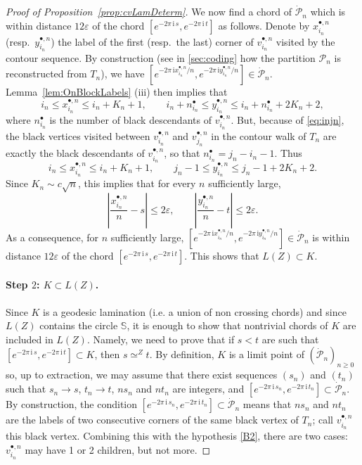 \documentclass[10pt]{amsart}
\theoremstyle{definition}\newtheorem{defi}[theo]{Definition}\newtheorem{rema}[theo]{Remark}\newtheorem{exam}[theo]{Example}\newtheorem{exem}[theo]{Example}\newtheorem{nota}[theo]{Notation}
\def\S{\mathbb{S}}
\def\PPP{\mathcal P}
\def\dPn{\dot{\mathcal{P}}_{n}}
\renewcommand{\epsilon}{\varepsilon}
\begin{document}
\begin{proof}[Proof of Proposition~\ref{prop:cvLamDeterm}]
We now find a chord of $ \dPn $ which is within distance $12\epsilon$ of the chord $[e^{-2\pi\, \textrm{i}\, s}, e^{-2\pi\, \textrm{i}\, t}]$ as follows. Denote by  $x^{\bullet,n}_{i_{n}}$ (resp.~$y ^{\bullet,n}_{i_{n}}$)  the label of the first (resp.~the last) corner of $v^{\bullet,n}_{i_{n}}$ visited by the contour sequence.
By construction (see in \cref{sec:coding} how the partition $\PPP_{n} $ is reconstructed from $T_{n}$),
we have $[e^{-2\pi\, \textrm{i} {x^{\bullet,n}_{i_{n}}}/{n}}, e^{-2\pi\, \textrm{i} {y ^{\bullet,n}_{i_{n}}}/{n}}] \in \dPn$.
Lemma~\ref{lem:OnBlockLabels}  (iii) then implies that
\begin{equation}
  i_{n} \leq x^{\bullet,n}_{i_{n}} \leq i_{n}+ K_{n}+1, \qquad  i_{n}+n^{\bullet}_{i_{n}} \leq y^{\bullet,n}_{i_{n}} \leq   i_{n}+n^{\bullet}_{i_{n}} + 2 K_{n}+2,
  \label{eq:Control_xy}
\end{equation}
where $n^{\bullet}_{i_{n}} $ is the number of black descendants of $v^{\bullet,n}_{i_{n}}$.
But, because of \eqref{eq:injn},  the black vertices visited between $v^{\bullet,n}_{i_{n}}$ and $v^{\bullet,n}_{j_{n}}$
in the contour walk of $T_{n}$ are exactly the black descendants of $v^{\bullet,n}_{i_{n}}$,
so that $n^{\bullet}_{i_{n}}= j_{n}-i_{n}-1$. Thus
\[i_{n} \leq x^{\bullet,n}_{i_{n}} \leq i_{n}+ K_{n}+1, \qquad  j_{n}-1 \leq y^{\bullet,n}_{i_{n}} \leq    j_{n}-1 + 2 K_{n}+2.\]
Since $K_{n} \sim c \sqrt{n}$, this implies that for every $n$ sufficiently large,
\[\left| \frac{x^{\bullet,n}_{i_{n}}}{n}-s \right| \leq 2 \epsilon, \qquad   \left| \frac{y^{\bullet,n}_{i_{n}}}{n}-t \right|  \leq 2 \epsilon.\]
As a consequence, for $n$ sufficiently large, $[e^{-2\pi\, \textrm{i} {x^{\bullet,n}_{i_{n}}}/{n}}, e^{-2\pi\, \textrm{i} {y ^{\bullet,n}_{i_{n}}}/{n}}] \in\dPn$  is within distance $12\epsilon$ of the chord $[e^{-2\pi\, \textrm{i}\, s}, e^{-2\pi\, \textrm{i}\, t}]$. This shows that $ L(Z)   \subset K$.

\paragraph*{Step $2$: $ K \subset L(Z)$.}
Since $K$ is a geodesic lamination (i.e. a union of non crossing chords) and since $L(Z)$ contains the circle $\S$,
it is enough to show that nontrivial chords of $K$ are included in $L(Z)$.
Namely, we need to prove that if $s<t$ are such that $[e^{-2\pi\, \textrm{i}\, s}, e^{-2\pi\, \textrm{i}\, t}] \subset K$,
then $s \simeq^Z t$.
By definition, $K$ is a limit point of $(\dPn)_{n \ge 0}$
so, up to extraction, we may assume that there exist sequences $(s_{n})$ and $(t_{n})$
such that $s_{n} \rightarrow s$, $t_{n} \rightarrow t$, $n s_{n}$ and $n t_{n}$ are integers, and $[e^{-2\pi\, \textrm{i}\, s_{n}}, e^{-2\pi\, \textrm{i}\, t_{n}}] \subset \dPn$.
By construction,
the condition $[e^{-2\pi\, \textrm{i}\, s_{n}}, e^{-2\pi\, \textrm{i}\, t_{n}}] \subset \dPn$
means that
$ns_n$ and $nt_n$ are the labels of two consecutive corners of the same black vertex of $T_n$;
call $v^{\bullet,n}_{i_{n}}$ this black vertex.
Combining this with the hypothesis \ref{B2}, there are two cases:
$v^{\bullet,n}_{i_{n}}$ may have 1 or 2 children, but not more.


\end{proof}
\end{document}
